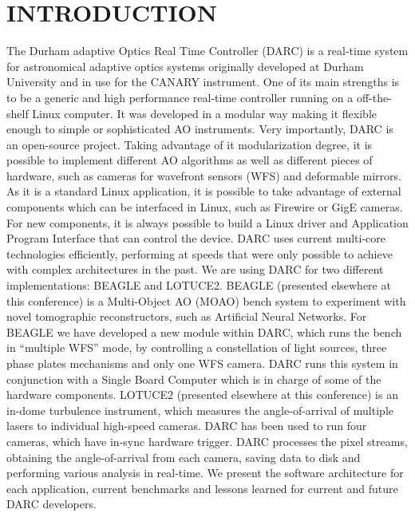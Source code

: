 \documentclass[]{spie}  %
\begin{document}
\section{INTRODUCTION}\label{sec:intro}  %
The Durham adaptive Optics Real Time Controller (DARC) is a real-time system
for astronomical adaptive optics systems originally developed at Durham
University and in use for the CANARY instrument. One of its main strengths is
to be a generic and high performance real-time controller running on a
off-the-shelf Linux computer. It was developed in a modular way making it
flexible enough to simple or sophisticated AO instruments. Very importantly,
DARC is an open-source project. Taking advantage of it modularization degree,
it is possible to implement different AO algorithms as well as different pieces
of hardware, such as cameras for wavefront sensors (WFS) and deformable
mirrors. As it is a standard Linux application, it is possible to take
advantage of external components which can be interfaced in Linux, such as
Firewire or GigE cameras. For new components, it is always possible to build a
Linux driver and Application Program Interface that can control the device.
DARC uses current multi-core technologies efficiently, performing at speeds
that were only possible to achieve with complex architectures in the past\cite{basden2012durham}. 
We are using DARC for two different implementations: BEAGLE and LOTUCE2. BEAGLE
(presented elsewhere at this conference) is a Multi-Object AO (MOAO) bench
system to experiment with novel tomographic reconstructors, such as Artificial
Neural Networks. For BEAGLE we have developed a new module within DARC, which
runs the bench in ``multiple WFS'' mode, by controlling a constellation of light
sources, three phase plates mechanisms and only one WFS camera. DARC runs this
system in conjunction with a Single Board Computer which is in charge of some
of the hardware components. LOTUCE2 (presented elsewhere at this conference) is
an in-dome turbulence instrument, which measures the angle-of-arrival of
multiple lasers to individual high-speed cameras. DARC has been used to run
four cameras, which have in-sync hardware trigger. DARC processes the pixel
streams, obtaining the angle-of-arrival from each camera, saving data to disk
and performing various analysis in real-time. We present the software
architecture for each application, current benchmarks and lessons learned for
current and future DARC developers.
\end{document}
